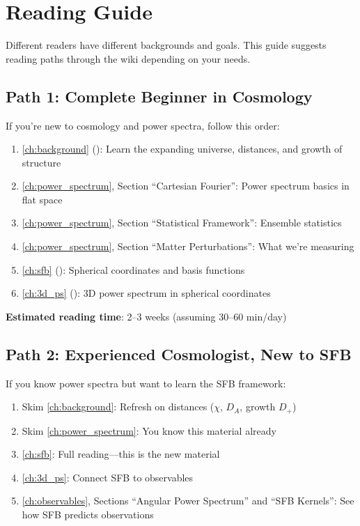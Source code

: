 \section{Reading Guide}\label{sec:reading_guide}

Different readers have different backgrounds and goals. This guide suggests reading paths through the wiki depending on your needs.

\subsection{Path 1: Complete Beginner in Cosmology}\label{subsec:guide_beginner}

If you're new to cosmology and power spectra, follow this order:

\begin{enumerate}
    \item \cref{ch:background} (): Learn the expanding universe, distances, and growth of structure
    \item \cref{ch:power_spectrum}, Section ``Cartesian Fourier'': Power spectrum basics in flat space
    \item \cref{ch:power_spectrum}, Section ``Statistical Framework'': Ensemble statistics
    \item \cref{ch:power_spectrum}, Section ``Matter Perturbations'': What we're measuring
    \item \cref{ch:sfb} (): Spherical coordinates and basis functions
    \item \cref{ch:3d_ps} (): 3D power spectrum in spherical coordinates
\end{enumerate}

\textbf{Estimated reading time}: 2--3 weeks (assuming 30--60 min/day)

\subsection{Path 2: Experienced Cosmologist, New to SFB}\label{subsec:guide_experienced}

If you know power spectra but want to learn the SFB framework:

\begin{enumerate}
    \item Skim \cref{ch:background}: Refresh on distances ($\chi$, $D_A$, growth $D_+$)
    \item Skim \cref{ch:power_spectrum}: You know this material already
    \item \cref{ch:sfb}: Full reading—this is the new material
    \item \cref{ch:3d_ps}: Connect SFB to observables
    \item \cref{ch:observables}, Sections ``Angular Power Spectrum'' and ``SFB Kernels'': See how SFB predicts observations
\end{enumerate}

